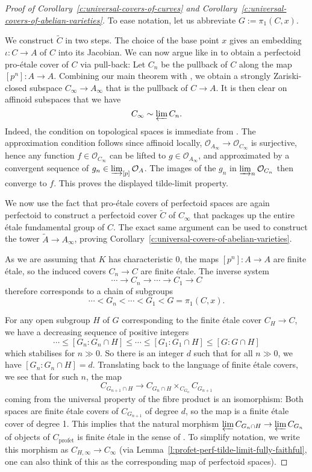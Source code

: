 \documentclass[10pt,oneside]{amsart}
\theoremstyle{definition}
\newcommand{\profet}{\operatorname{prof\acute{e}t}}
\begin{document}
\begin{proof}[Proof of Corollary~\ref{c:universal-covers-of-curves} and Corollary~\ref{c:universal-covers-of-abelian-varieties}]
To ease notation, let us abbreviate $G:=\pi_1(C,x)$.
	
We construct $\widetilde{C}$ in two steps. 
The choice of the base point $x$ gives an embedding $\iota\colon C\rightarrow A$ of $C$ into its Jacobian. We can now argue like in \cite[IV.1]{torsion} to obtain a perfectoid pro-\'etale cover of $C$ via pull-back: Let $C_n$ be the pullback of $C$ along the map $[p^n]\colon A\rightarrow A$. Combining our main theorem with \cite[Lemma II.2.2]{torsion}, we obtain a strongly Zariski-closed subspace $C_\infty\to A_\infty$ that is the pullback of $C\to A$. It is then clear on affinoid subspaces that we have \[C_\infty\sim \varprojlim C_n.\]
Indeed, the condition on topological spaces is immediate from \cite[Lemma II.2.2]{torsion}. The approximation condition follows since affinoid locally, $\mathcal O_{A_\infty}\to \mathcal O_{C_\infty}$ is surjective, hence any function $f\in \mathcal O_{C_\infty}$ can be lifted to $g\in \mathcal O_{A_\infty}$, and approximated by a convergent sequence of $g_n\in\varinjlim_{[p]}\mathcal O_{A}$. The images of the $g_n$ in $\varinjlim_n\mathcal O_{C_n}$ then converge to $f$. This proves the displayed tilde-limit property.

We now use the fact that pro-\'etale covers of perfectoid spaces are again perfectoid to construct a perfectoid cover $\widetilde{C}$ of $C_\infty$ that packages up the entire \'etale fundamental group of $C$. The exact same argument can be used to construct the tower $\widetilde{A}\to A_\infty$, proving Corollary~\ref{c:universal-covers-of-abelian-varieties}.

As we are assuming that $K$ has characteristic 0, the maps $[p^n]\colon A\rightarrow A$ are finite \'etale, so the induced covers $C_n\rightarrow C$ are finite \'etale. The inverse system 
\[\cdots \rightarrow C_n \rightarrow \cdots \rightarrow C_1\rightarrow C\] 
therefore corresponds to a chain of subgroups
\[\cdots < G_n <\cdots < G_1 < G=\pi_1(C,x).\]

For any open subgroup $H$ of $G$ corresponding to the finite \'etale cover $C_H\rightarrow C$, we have a decreasing sequence of positive integers 
\[\cdots \leq [G_n:G_n\cap H] \leq \cdots \leq [G_1:G_1\cap H]\leq [G:G\cap H]\]
which stabilises for $n\gg 0$.
So there is an integer $d$ such that for all $n\gg0 $, we have $[G_n:G_n\cap H]=d$. Translating back to the language of finite \'etale covers, we see that for such $n$, the map
\[C_{G_{n+1}\cap H}\rightarrow C_{G_n\cap H}\times_{C_{G_n}} C_{G_{n+1}}\]
coming from the universal property of the fibre product is an isomorphism: Both spaces are finite \'etale covers of $C_{G_{n+1}}$ of degree $d$, so the map is a finite \'etale cover of degree 1. This implies that the natural morphism $\varprojlim C_{G_n \cap H}\rightarrow \varprojlim C_{G_n}$ of objects of $C_{\profet}$ is finite \'etale in the sense of \cite[Definition 3.9]{p-adic_Hodge}. To simplify notation, we write this morphism as $C_{H,\infty}\rightarrow C_\infty$ (via Lemma~\ref{l:profet-perf-tilde-limit-fully-faithful}, one can also think of this as the corresponding map of perfectoid spaces).


\end{proof}
\end{document}

